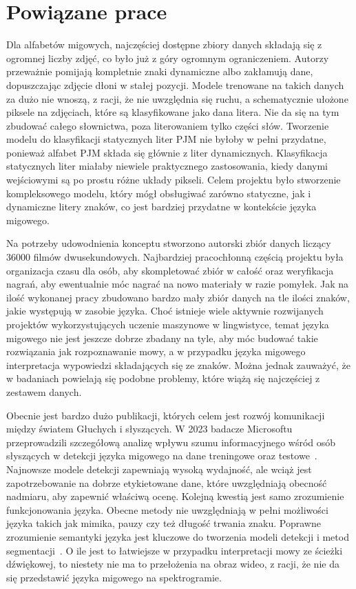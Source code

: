 \section{Powiązane prace}
\label{sec:related-works}

Dla alfabetów migowych, najczęściej dostępne zbiory danych składają się z ogromnej liczby zdjęć, co było już z góry ogromnym ograniczeniem. Autorzy przeważnie pomijają kompletnie znaki dynamiczne albo zakłamują dane, dopuszczając zdjęcie dłoni w stałej pozycji. Modele trenowane na takich danych za dużo nie wnoszą, z racji, że nie uwzględnia się ruchu, a schematycznie ułożone piksele na zdjęciach, które są klasyfikowane jako dana litera. Nie da się na tym zbudować całego słownictwa, poza literowaniem tylko części słów. Tworzenie modelu do klasyfikacji statycznych liter PJM nie byłoby w pełni przydatne, ponieważ alfabet PJM składa się głównie z liter dynamicznych. Klasyfikacja statycznych liter miałaby niewiele praktycznego zastosowania, kiedy danymi wejściowymi są po prostu różne układy pikseli. Celem projektu było stworzenie kompleksowego modelu, który mógł obsługiwać zarówno statyczne, jak i dynamiczne litery znaków, co jest bardziej przydatne w kontekście języka migowego.

Na potrzeby udowodnienia konceptu stworzono autorski zbiór danych liczący 36000 filmów dwusekundowych. Najbardziej pracochłonną częścią projektu była organizacja czasu dla osób, aby skompletować zbiór w całość oraz weryfikacja nagrań, aby ewentualnie móc nagrać na nowo materiały w razie pomyłek. Jak na ilość wykonanej pracy zbudowano bardzo mały zbiór danych na tle ilości znaków, jakie występują w zasobie języka. Choć istnieje wiele aktywnie rozwijanych projektów wykorzystujących uczenie maszynowe w lingwistyce, temat języka migowego nie jest jeszcze dobrze zbadany na tyle, aby móc budować takie rozwiązania jak rozpoznawanie mowy, a w przypadku języka migowego interpretacja wypowiedzi składających się ze znaków. Można jednak zauważyć, że w badaniach powielają się podobne problemy, które wiążą się najczęściej z zestawem danych.

Obecnie jest bardzo dużo publikacji, których celem jest rozwój komunikacji między światem Głuchych i słyszących. W 2023 badacze Microsoftu przeprowadzili szczegółową analizę wpływu szumu informacyjnego wśród osób słyszących w detekcji języka migowego na dane treningowe oraz testowe~\cite{pal2023}. Najnowsze modele detekcji zapewniają wysoką wydajność, ale wciąż jest zapotrzebowanie na dobrze etykietowane dane, które uwzględniają obecność nadmiaru, aby zapewnić właściwą ocenę. Kolejną kwestią jest samo zrozumienie funkcjonowania języka. Obecne metody nie uwzględniają w pełni możliwości języka takich jak mimika, pauzy czy też długość trwania znaku. Poprawne zrozumienie semantyki języka jest kluczowe do tworzenia modeli detekcji i metod segmentacji~\cite{deSisto2021}. O ile jest to łatwiejsze w przypadku interpretacji mowy ze ścieżki dźwiękowej, to niestety nie ma to przełożenia na obraz wideo, z racji, że nie da się przedstawić języka migowego na spektrogramie.
